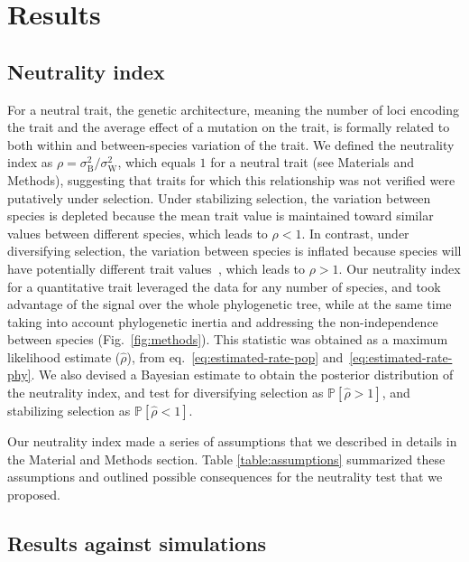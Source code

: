 \documentclass{article}
\newcommand{\proba}{\mathbb{P}}
\newcommand{\RateBetween}{\sigma^2_{\mathrm{B}}}
\newcommand{\RateWhithin}{\sigma^2_{\mathrm{W}}}
\newcommand{\NI}{\rho}
\newcommand{\EstNI}{\widehat{\rho}}
\begin{document}
\section{Results}\label{sec:results}

\subsection{Neutrality index}

For a neutral trait, the genetic architecture, meaning the number of loci encoding the trait and the average effect of a mutation on the trait, is formally related to both within and between-species variation of the trait.
We defined the neutrality index as $\NI = \RateBetween/\RateWhithin$, which equals $1$ for a neutral trait (see Materials and Methods), suggesting that traits for which this relationship was not verified were putatively under selection.
Under stabilizing selection, the variation between species is depleted because the mean trait value is maintained toward similar values between different species, which leads to $\NI < 1$.
In contrast, under diversifying selection, the variation between species is inflated because species will have potentially different trait values~\parencite{hansen_stabilizing_1997}, which leads to $\NI > 1$.
Our neutrality index for a quantitative trait leveraged the data for any number of species, and took advantage of the signal over the whole phylogenetic tree, while at the same time taking into account phylogenetic inertia and addressing the non-independence between species (Fig.~\ref{fig:methods}).
This statistic was obtained as a maximum likelihood estimate ($\EstNI$), from eq.~\ref{eq:estimated-rate-pop} and~\ref{eq:estimated-rate-phy}.
We also devised a Bayesian estimate to obtain the posterior distribution of the neutrality index, and test for diversifying selection as $\proba [\EstNI > 1]$, and stabilizing selection as $\proba [\EstNI < 1]$.

Our neutrality index made a series of assumptions that we described in details in the Material and Methods section.
Table \ref{table:assumptions} summarized these assumptions and outlined possible consequences for the neutrality test that we proposed.

\subsection{Results against simulations}\label{subsec:results-against-simulations}
\end{document}
